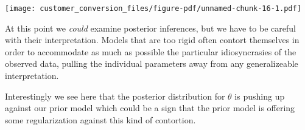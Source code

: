 \documentclass[
  letterpaper,
  DIV=11,
  numbers=noendperiod]{scrartcl}
\newenvironment{Shaded}{\begin{snugshade}}{\end{snugshade}}
\newcommand{\AttributeTok}[1]{\textcolor[rgb]{0.40,0.45,0.13}{#1}}
\newcommand{\ControlFlowTok}[1]{\textcolor[rgb]{0.00,0.23,0.31}{#1}}
\newcommand{\DecValTok}[1]{\textcolor[rgb]{0.68,0.00,0.00}{#1}}
\newcommand{\FunctionTok}[1]{\textcolor[rgb]{0.28,0.35,0.67}{#1}}
\newcommand{\NormalTok}[1]{\textcolor[rgb]{0.00,0.23,0.31}{#1}}
\newcommand{\OtherTok}[1]{\textcolor[rgb]{0.00,0.23,0.31}{#1}}
\newcommand{\SpecialCharTok}[1]{\textcolor[rgb]{0.37,0.37,0.37}{#1}}
\newcommand{\StringTok}[1]{\textcolor[rgb]{0.13,0.47,0.30}{#1}}
\begin{document}
\begin{Shaded}
\end{Shaded}

\texttt{[image: customer\_conversion\_files/figure-pdf/unnamed-chunk-16-1.pdf]}

At this point we \emph{could} examine posterior inferences, but we have
to be careful with their interpretation. Models that are too rigid often
contort themselves in order to accommodate as much as possible the
particular idiosyncrasies of the observed data, pulling the individual
parameters away from any generalizeable interpretation.

Interestingly we see here that the posterior distribution for \(\theta\)
is pushing up against our prior model which could be a sign that the
prior model is offering some regularization against this kind of
contortion.
\end{document}
